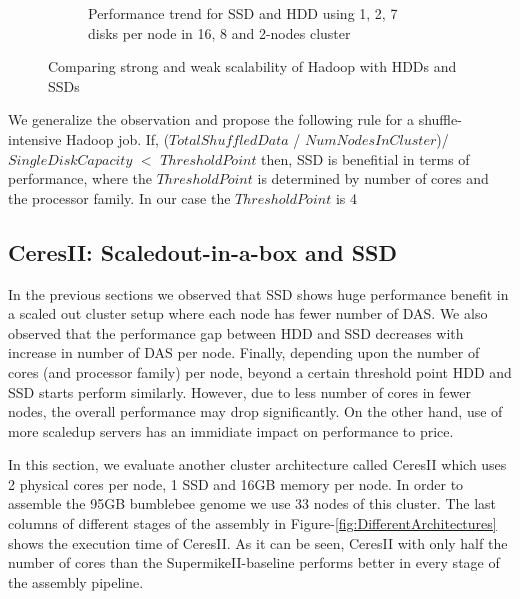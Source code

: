 \documentclass[conference]{IEEEtran}
\begin{document}
\begin{figure}[h]
\begin{subfigure}[b]{0.23\textwidth}
          \caption{Performance trend for SSD and HDD using 1, 2, 7 disks per node in 16, 8 and 2-nodes cluster}
          \label{fig:SsdNHddDiffNodes}
  \end{subfigure}
  \caption{Comparing strong and weak scalability of Hadoop with HDDs and SSDs}
  \label{fig:SsdNHdd}
\end{figure}
We generalize the observation and propose the following rule for a shuffle-intensive Hadoop job.
If,  
($TotalShuffledData$ / $NumNodesInCluster$)/ $SingleDiskCapacity$ $<$ $ThresholdPoint $
then, SSD is benefitial in terms of performance, where the $ThresholdPoint$ is determined by number of cores and the processor family. In our case the $ThresholdPoint$ is 4

\subsection {CeresII: Scaledout-in-a-box and SSD} \label{CeresII:Scaledout-in-a-boxAndSSD}
In the previous sections we observed that SSD shows huge performance benefit in a scaled out cluster setup where each node has fewer number of DAS.
We also observed that the performance gap between HDD and SSD decreases with increase in number of DAS per node.
Finally, depending upon the number of cores (and processor family) per node, beyond a certain threshold point HDD and SSD starts perform similarly.
However, due to less number of cores in fewer nodes, the overall performance may drop significantly. On the other hand, use of more scaledup servers has an immidiate impact on performance to price.

In this section, we evaluate another cluster architecture called CeresII which uses 2 physical cores per node, 1 SSD and 16GB memory per node.  In order to assemble the 95GB bumblebee genome we use 33 nodes of this cluster.
The last columns of different stages of the assembly in Figure-\ref{fig:DifferentArchitectures} shows the execution time of CeresII.
As it can be seen, CeresII with only half the number of cores than the SupermikeII-baseline performs better in every stage of the assembly pipeline.

\end{document}
